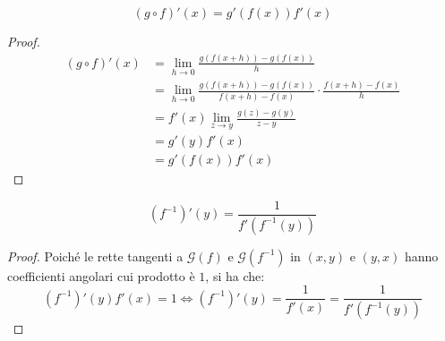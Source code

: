 \begin{theorem}
  $$\left( g\circ f \right)'\left( x \right)=g'\left( f\left( x \right) \right)f'\left( x \right)$$
\end{theorem}
\begin{proof}
  \begin{align*}
    \left( g\circ f \right)'\left( x \right) & =\lim_{h\to0}\frac{g\left( f\left( x+h \right) \right)-g\left( f\left( x \right) \right)}{h}                                                                                          \\
                                             & =\lim_{h\to0}\frac{g\left( f\left( x+h \right) \right)-g\left( f\left( x \right) \right)}{f\left( x+h \right)-f\left( x \right)}\cdot \frac{f\left( x+h \right)-f\left( x \right)}{h} \\
                                             & =f'\left( x \right) \lim_{z\to y}\frac{g\left( z \right)-g\left( y \right)}{z-y}                                                                                                      \\
                                             & =g'\left( y \right)f'\left( x \right)                                                                                                                                                 \\
                                             & =g'\left( f\left( x \right) \right)f'\left( x \right)                                                                                                                                 
  \end{align*}
\end{proof}

\begin{theorem}
  $$\left( f^{-1} \right)'\left( y \right)=\frac{1}{f'\left( f^{-1}\left( y \right) \right)}$$
\end{theorem}
\begin{proof}
  Poiché le rette tangenti a $\mathcal{G}\left( f \right)$ e $\mathcal{G}\left( f^{-1} \right)$ in $\left( x,y \right)$ e $\left( y,x \right)$ hanno coefficienti angolari cui prodotto è $1$, si ha che:
  $$\left( f^{-1} \right)'\left( y \right)f'\left( x \right)=1\iff \left( f^{-1} \right)'\left( y \right)=\frac{1}{f'\left( x \right)}=\frac{1}{f'\left( f^{-1}\left( y \right) \right)}$$
\end{proof}

